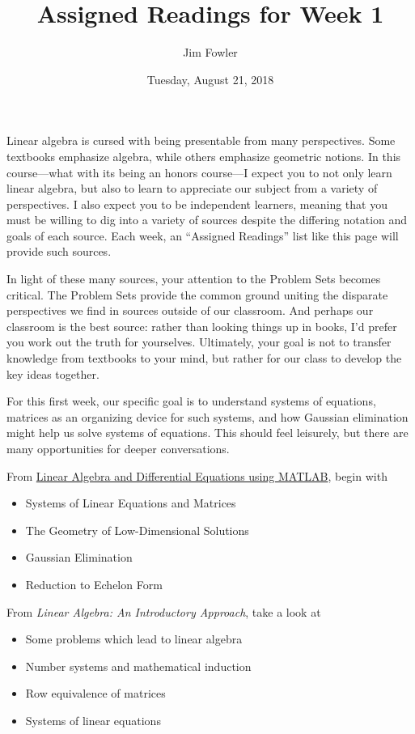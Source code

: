 \documentclass{homework}
\author{Jim Fowler}
\title{Assigned Readings for Week 1}
\date{Tuesday, August 21, 2018}
\begin{document}
\maketitle

Linear algebra is cursed with being presentable from many
perspectives.  Some textbooks emphasize algebra, while others
emphasize geometric notions.  In this course---what with its being an
honors course---I expect you to not only learn linear algebra, but
also to learn to appreciate our subject from a variety of
perspectives.  I also expect you to be independent learners, meaning
that you must be willing to dig into a variety of sources despite the
differing notation and goals of each source.  Each week, an ``Assigned
Readings'' list like this page will provide such sources.

In light of these many sources, your attention to the Problem Sets
becomes critical.  The Problem Sets provide the common ground uniting
the disparate perspectives we find in sources outside of our
classroom.  And perhaps our classroom is the best source: rather than
looking things up in books, I'd prefer you work out the truth for
yourselves.  Ultimately, your goal is not to transfer knowledge from
textbooks to your mind, but rather for our class to develop the key
ideas together.

For this first week, our specific goal is to understand systems of
equations, matrices as an organizing device for such systems, and how
Gaussian elimination might help us solve systems of equations.  This
should feel leisurely, but there are many opportunities for deeper
conversations.

From \href{/courses/43735/files/folder/textbooks}{Linear Algebra and
  Differential Equations using MATLAB}, begin with
\begin{itemize}
\item {} Systems of Linear Equations and Matrices
\item {} The Geometry of Low-Dimensional Solutions
\item {} Gaussian Elimination
\item {} Reduction to Echelon Form
\end{itemize}

From \textit{Linear Algebra: An Introductory Approach}, take a look at
\begin{itemize}
\item {} Some problems which lead to linear algebra
\item {} Number systems and mathematical induction
\item {} Row equivalence of matrices
\item {} Systems of linear equations
\end{itemize}
\end{document}
